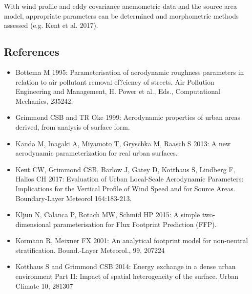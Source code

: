\documentclass[letterpaper,10pt,english]{sphinxmanual}
\begin{document}
With wind profile and eddy covariance anemometric data and the source
area model, appropriate parameters can be determined and morphometric
methods assessed (e.g. Kent et al. 2017).


\subsection{References}
\label{\detokenize{Tutorials/Footprint:references}}\begin{itemize}
\item {} 
Bottema M 1995: Parameterisation of aerodynamic roughness parameters
in relation to air pollutant removal ef?ciency of streets. Air
Pollution Engineering and Management, H. Power et al., Eds.,
Computational Mechanics, 235\textendash{}242.

\item {} 
Grimmond CSB and TR Oke 1999: Aerodynamic properties of urban areas
derived, from analysis of surface form. 

\item {} 
Kanda M, Inagaki A, Miyamoto T, Gryschka M, Raasch S 2013: A new
aerodynamic parameterization for real urban surfaces. 

\item {} 
Kent CW, Grimmond CSB, Barlow J, Gatey D, Kotthaus S, Lindberg F,
Halios CH 2017: Evaluation of Urban Local-Scale Aerodynamic
Parameters: Implications for the Vertical Profile of Wind Speed and
for Source Areas. Boundary-Layer Meteorol 164:183-213.

\item {} 
Kljun N, Calanca P, Rotach MW, Schmid HP 2015: A simple
two-dimensional parameterisation for Flux Footprint Prediction (FFP).

\item {} 
Kormann R, Meixner FX 2001: An analytical footprint model for
non-neutral stratification. Bound.-Layer Meteorol., 99, 207\textendash{}224

\item {} 
Kotthaus S and Grimmond CSB 2014: Energy exchange in a dense urban
environment \textendash{} Part II: Impact of spatial heterogeneity of the
surface. Urban Climate 10, 281\textendash{}307


\end{itemize}
\end{document}

